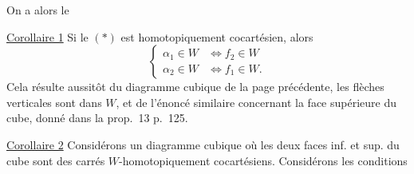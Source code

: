 On a alors le

\uline{Corollaire 1}  Si le   $(\ast)$ est homotopiquement cocartésien, alors
\[
\left\{\begin{aligned}
\alpha_1\in W&\Longleftrightarrow f_2\in W\\
\alpha_2\in W&\Longleftrightarrow f_1\in W .
\end{aligned}\right.
\]
Cela résulte aussitôt du diagramme cubique de la page précédente,   les flèches verticales sont dans $W$, et de l'énoncé similaire concernant la face supérieure du cube, donné dans la prop.~13 p.~125.

\uline{Corollaire 2}  Considérons un diagramme cubique
 où les deux faces inf. et sup. du cube sont des carrés $W$-homotopiquement cocartésiens. Considérons les conditions
